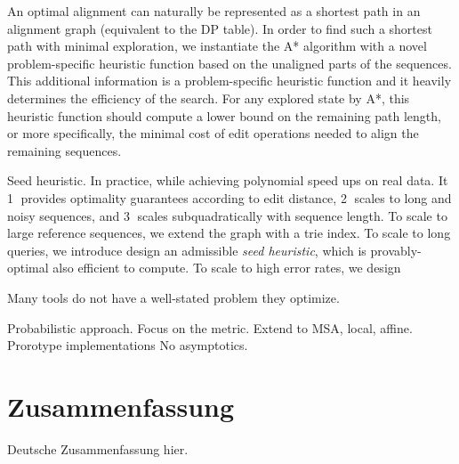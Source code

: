 An optimal alignment can naturally be represented as a shortest path in an
alignment graph (equivalent to the DP table). In order to find such a shortest
path with minimal exploration, we instantiate the A* algorithm with a novel
problem-specific heuristic function based on the unaligned parts of the
sequences. This additional information is a problem-specific heuristic function
and it heavily determines the efficiency of the search. For any explored state
by A*, this heuristic function should compute a lower bound on the remaining
path length, or more specifically, the minimal cost of edit operations needed to
align the remaining sequences.

Seed heuristic. In practice, while achieving polynomial speed ups on real data.
It \textcircled{1} provides optimality guarantees according to edit distance,
\textcircled{2} scales to long and noisy sequences, and \textcircled{3} scales
subquadratically with sequence length. To scale to large reference sequences, we
extend the graph with a trie index. To scale to long queries, we introduce
design an admissible \emph{seed heuristic}, which is provably-optimal also
efficient to compute. To scale to high error rates, we design  

Many tools do not have a well-stated problem they optimize.

Probabilistic approach.
Focus on the metric.
Extend to MSA, local, affine.
Prorotype implementations
No asymptotics.


\endgroup

\cleardoublepage%

\begingroup
\let\clearpage\relax
\let\cleardoublepage\relax
\let\cleardoublepage\relax

\chapter*{Zusammenfassung}

Deutsche Zusammenfassung hier.


\endgroup

\vfill